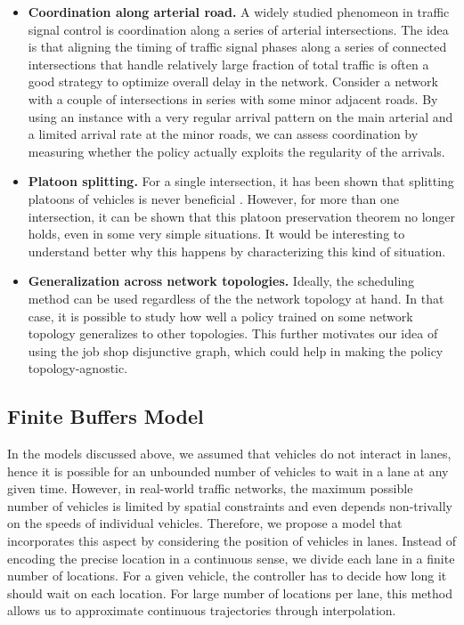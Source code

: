 \documentclass{article}
\begin{document}
\begin{itemize}

  \item \textbf{Coordination along arterial road.} A widely studied phenomeon in
        traffic signal control is coordination along a series of arterial
        intersections. The idea is that aligning the timing of traffic signal
        phases along a series of connected intersections that handle relatively
        large fraction of total traffic is often a good strategy to optimize
        overall delay in the network. Consider a network with a couple of
        intersections in series with some minor adjacent roads. By using an
        instance with a very regular arrival pattern on the main arterial and a
        limited arrival rate at the minor roads, we can assess coordination by
        measuring whether the policy actually exploits the regularity of the
        arrivals.

  \item \textbf{Platoon splitting.} For a single intersection, it has been shown
        that splitting platoons of vehicles is never beneficial
        \cite{limpens_online_2023}. However, for more than one intersection, it
        can be shown that this platoon preservation theorem no longer holds,
        even in some very simple situations. It would be interesting to
        understand better why this happens by characterizing this kind of
        situation.

  \item \textbf{Generalization across network topologies.} Ideally, the
        scheduling method can be used regardless of the the network
        topology at hand. In that case, it is possible to study how well a
        policy trained on some network topology generalizes to other topologies.
        This further motivates our idea of using the job shop disjunctive graph,
        which could help in making the policy topology-agnostic.
\end{itemize}


\subsection{Finite Buffers Model}


In the models discussed above, we assumed that vehicles do not interact in
lanes, hence it is possible for an unbounded number of vehicles to wait in a
lane at any given time. However, in real-world traffic networks, the maximum
possible number of vehicles is limited by spatial constraints and even depends
non-trivally on the speeds of individual vehicles. Therefore, we propose a model
that incorporates this aspect by considering the position of vehicles in lanes.
Instead of encoding the precise location in a continuous sense, we divide each
lane in a finite number of locations. For a given vehicle, the controller has to
decide how long it should wait on each location. For large number of locations
per lane, this method allows us to approximate continuous trajectories through
interpolation.
\end{document}
